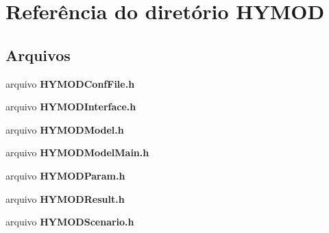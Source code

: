 \section{Referência do diretório H\+Y\+M\+OD}
\label{dir_bbb732508960c5560da5f26124e242b6}
\subsection*{Arquivos}
\begin{DoxyCompactItemize}
\item 
arquivo {\bf H\+Y\+M\+O\+D\+Conf\+File.\+h}
\item 
arquivo {\bf H\+Y\+M\+O\+D\+Interface.\+h}
\item 
arquivo {\bf H\+Y\+M\+O\+D\+Model.\+h}
\item 
arquivo {\bf H\+Y\+M\+O\+D\+Model\+Main.\+h}
\item 
arquivo {\bf H\+Y\+M\+O\+D\+Param.\+h}
\item 
arquivo {\bf H\+Y\+M\+O\+D\+Result.\+h}
\item 
arquivo {\bf H\+Y\+M\+O\+D\+Scenario.\+h}
\end{DoxyCompactItemize}
